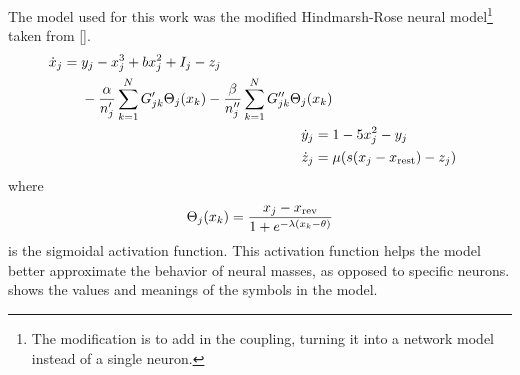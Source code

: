 The model used for this work was the modified Hindmarsh-Rose neural model\footnote{The modification is to add in the coupling, turning it into a network model instead of a single neuron.} taken from [].
\begin{align}
  \begin{split}
  \label{eq:hr_x}
  \dot{\hrx}_{j}
  ={}&
    \hry_{j}
    -
    \hrx_{j}^{3}
    +
    b \hrx_{j}^{2}
    +
    I_{j}
    -
    \hrz_{j} \\
    & -
    \frac{\hra}{n'_{j}} \sum_{k = 1}^{N} G'_{j k} \Theta_{j}(\hrx_{k})
    -
    \frac{\hrb}{n''_{j}} \sum_{k = 1}^{N} G''_{j k} \Theta_{j}(\hrx_{k})
    \end{split} \\
  \label{eq:hr_y}
  \dot{\hry}_{j}
  ={}&
    1
    -
    5 \hrx_{j}^{2}
    -
    \hry_{j} \\
  \label{eq:hr_z}
  \dot{\hrz}_{j}
  ={}&
    \mu \pqty{s \pqty{\hrx_{j} - \hrx_{\text{rest}}} - \hrz_{j}}
\end{align}
where
\begin{equation}
  \label{eq:hr_sigmoid}
  \Theta_{j}(\hrx_{k})
  =
  \frac{\hrx_{j} - \hrx_{\text{rev}}}{1 + e^{-\lambda \pqty{\hrx_{k} - \theta}}}
\end{equation}
is the sigmoidal activation function.
This activation function helps the model better approximate the behavior of neural masses, as opposed to specific neurons.
 shows the values and meanings of the symbols in the model.

